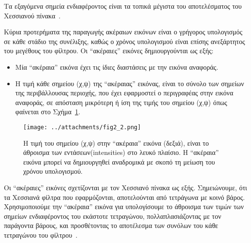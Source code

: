 \newpage

Τα εξαγόμενα σημεία ενδιαφέροντος είναι τα τοπικά μέγιστα του αποτελέσματος του Xεσσιανού πίνακα~\cite{pedersen2011}.


Κύρια προτερήματα της παραγωγής ακέραιων εικόνων είναι ο γρήγορος υπολογισμός σε κάθε στάδιο της συνέλιξης, καθώς ο χρόνος υπολογισμού είναι επίσης ανεξάρτητος του μεγέθους του φίλτρου.
Οι ``ακέραιες'' εικόνες δημιουργούνται ως εξής:

\begin{itemize}
 

 \item Μία ``ακέραια'' εικόνα έχει τις ίδιες διαστάσεις με την εικόνα αναφοράς.
 \item Η τιμή κάθε σημείου (χ,ψ) της ``ακέραιας'' εικόνας, είναι το σύνολο των σημείων της περιβάλλουσας περιοχής,
που έχει εφαρμοστεί ο περιγραφέας στην εικόνα αναφοράς, σε απόσταση μικρότερη ή ίση της τιμής του σημείου (χ,ψ) όπως φαίνεται στο Σχήμα~\ref{fig:surf_figure}.



\end{itemize}




\begin{figure}[ht]
\begin{center}
\advance\leftskip-3cm
\advance\rightskip-3cm
 \texttt{[image: ../attachments/fig2\_2.png]}
\caption{Η  τιμή  του σημείου (χ,ψ) στην ``ακέραια'' εικόνα (δεξιά), είναι το άθροισμα των εντάσεων(intensities) στο λευκό πλαίσιο. 
           Η ``ακέραια'' εικόνα μπορεί να δημιουργηθεί αναδρομικά με σκοπό τη μείωση του χρόνου υπολογισμού.}
\label{fig:surf_figure}
\end{center}
\end{figure}



Οι ``ακέραιες'' εικόνες σχετίζονται με τον Χεσσιανό πίνακα ως εξής.
Σημειώνουμε, ότι τα Χεσσιανά φίλτρα που εφαρμόζονται, αποτελούνται από τετράγωνα με κοινό βάρος. 
Χρησιμοποιούμε την ``ακέραια'' εικόνα για υπολογίσουμε το άθροισμα των τιμών των σημείων ενδιαφέροντος του εκάστοτε τετραγώνου, 
πολλαπλασιάζοντας με τον παράγοντα βάρους, και προσθέτοντας το αποτέλεσμα των συνόλων του κάθε τετραγώνου του φίλτρου~\cite{scottsmith}. 







\newpage         %

